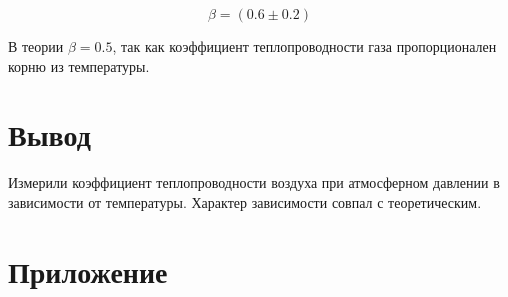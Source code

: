 \documentclass[a4paper, 12pt]{article}
\begin{document}
            $$ \beta = (0.6 \pm 0.2) $$

            В теории $ \beta = 0.5$, так как коэффициент теплопроводности газа пропорционален корню из температуры.

    \section{Вывод}

        Измерили коэффициент теплопроводности воздуха при атмосферном давлении в зависимости от температуры. Характер зависимости совпал с теоретическим.

    \section{Приложение}
\end{document}
